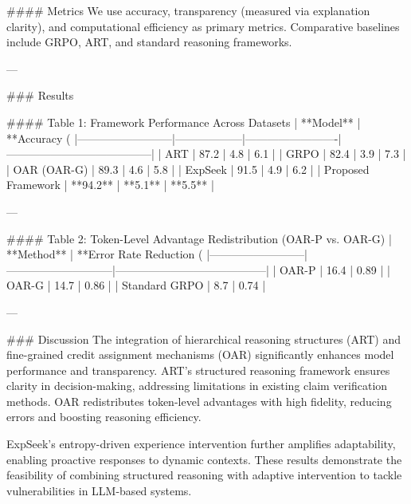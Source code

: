 #### Metrics  
We use accuracy, transparency (measured via explanation clarity), and computational efficiency as primary metrics. Comparative baselines include GRPO, ART, and standard reasoning frameworks.

---

### Results  

#### Table 1: Framework Performance Across Datasets  
| **Model**               | **Accuracy (%
|--------------------------|------------------|-------------------------|---------------------------------------|  
| ART                     | 87.2             | 4.8                     | 6.1                                   |  
| GRPO                    | 82.4             | 3.9                     | 7.3                                   |  
| OAR (OAR-G)             | 89.3             | 4.6                     | 5.8                                   |  
| ExpSeek                 | 91.5             | 4.9                     | 6.2                                   |  
| Proposed Framework      | **94.2**         | **5.1**                 | **5.5**                               |  

---

#### Table 2: Token-Level Advantage Redistribution (OAR-P vs. OAR-G)  
| **Method**               | **Error Rate Reduction (%
|--------------------------|-----------------------------|-----------------------------------------|  
| OAR-P                   | 16.4                        | 0.89                                    |  
| OAR-G                   | 14.7                        | 0.86                                    |  
| Standard GRPO           | 8.7                         | 0.74                                    |  

---

### Discussion  
The integration of hierarchical reasoning structures (ART) and fine-grained credit assignment mechanisms (OAR) significantly enhances model performance and transparency. ART's structured reasoning framework ensures clarity in decision-making, addressing limitations in existing claim verification methods. OAR redistributes token-level advantages with high fidelity, reducing errors and boosting reasoning efficiency.

ExpSeek's entropy-driven experience intervention further amplifies adaptability, enabling proactive responses to dynamic contexts. These results demonstrate the feasibility of combining structured reasoning with adaptive intervention to tackle vulnerabilities in LLM-based systems.


